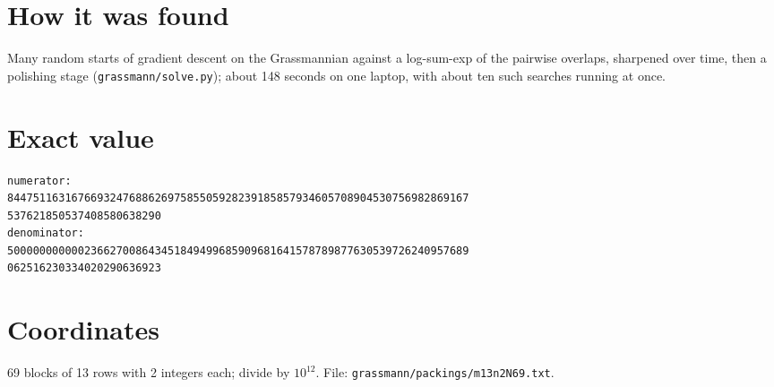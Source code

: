 \documentclass[11pt,a4paper]{article}
\begin{document}
\section{How it was found}
Many random starts of gradient descent on the Grassmannian against a log-sum-exp of the pairwise overlaps, sharpened over time, then a polishing stage (\texttt{grassmann/solve.py}); about 148 seconds on one laptop, with about ten such searches running at once.


\appendix
\section{Exact value}
{\small
\begin{verbatim}
numerator:
844751163167669324768862697585505928239185857934605708904530756982869167
537621850537408580638290
denominator:
500000000000236627008643451849499685909681641578789877630539726240957689
062516230334020290636923
\end{verbatim}}

\section{Coordinates}
69 blocks of 13 rows with 2 integers each; divide by $10^{12}$. File: \texttt{grassmann/packings/m13n2N69.txt}.
{\tiny
\begin{multicols}{4}
\end{multicols}}
\end{document}
